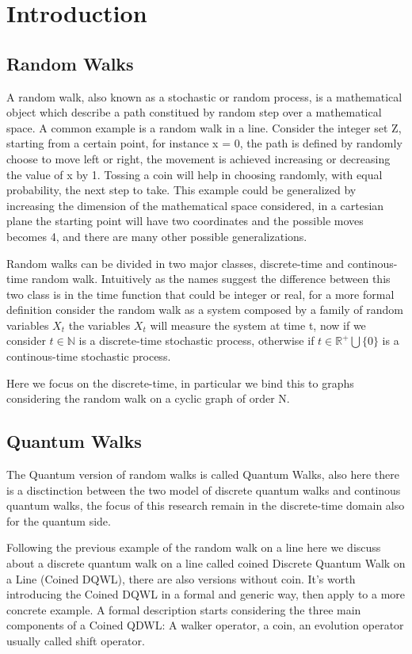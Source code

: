 \section{Introduction}
\subsection{Random Walks}

A random walk, also known as a stochastic or random process, is a mathematical object which describe a path constitued by random step over a mathematical space. A common 
example is a random walk in a line. Consider the integer set Z, starting from a certain point, for instance x = 0, the path is defined by randomly choose to move left or 
right, the movement is achieved increasing or decreasing the value of x by 1. Tossing a coin will help in choosing randomly, with equal probability, the next step to take. 
This example could be generalized by increasing the dimension of the mathematical space considered, in a cartesian plane the starting point will have two  
coordinates and the possible moves becomes 4, and there are many other possible generalizations.

Random walks can be divided in two major classes, discrete-time and continous-time random walk. Intuitively as the names suggest the difference between this two class 
is in the time function that could be integer or real, for a more formal definition consider the random walk as a system composed by a family of random variables ${X_{t}}$
the variables $X_{t}$ will measure the system at time t, now if we consider $t\in \mathbb{N}$  is a discrete-time stochastic process, otherwise if 
$t \in \mathbb{R}^{+} \bigcup \{0\}$ is a continous-time stochastic process. 

Here we focus on the discrete-time, in particular we bind this to graphs considering the random walk on a cyclic graph of order N.

\subsection{Quantum Walks}

The Quantum version of random walks is called Quantum Walks, also here there is a disctinction between the two model of discrete quantum walks and 
continous quantum walks, the focus of this research remain in the discrete-time domain also for the quantum side. 

Following the previous example of the random walk on a line here we discuss about a discrete quantum walk on a line called coined Discrete Quantum Walk on a Line (Coined DQWL), there are also versions without coin. It's worth introducing
the Coined DQWL in a formal and generic way, then apply to a more concrete example. A formal description starts considering the three main components of a Coined QDWL: 
A walker operator, a coin, an evolution operator usually called shift operator. 

